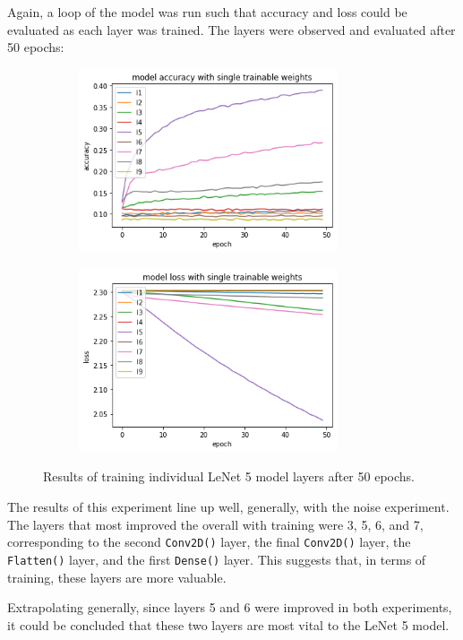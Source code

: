 \documentclass{article}
\begin{document}
Again, a loop of the model was run such that accuracy and loss could be evaluated as each layer was trained.
The layers were observed and evaluated after 50 epochs:

\begin{figure}[H]
\centering
\begin{subfigure}
  \centering
  \includegraphics[width=3in]{csci-8920/hw-2/images/accuracy-trainable.png}
  \label{fig:accuracy-t}
\end{subfigure}%
\begin{subfigure}
  \centering
  \includegraphics[width=3in]{csci-8920/hw-2/images/loss-trainable.png}
  \label{fig:loss-t}
\end{subfigure}
\caption{Results of training individual LeNet 5 model layers after 50 epochs.}
\label{fig:trainable}
\end{figure}

The results of this experiment line up well, generally, with the noise experiment.
The layers that most improved the overall with training were 3, 5, 6, and 7, corresponding to the second \lstinline{Conv2D()} layer, the final \lstinline{Conv2D()} layer, the \lstinline{Flatten()} layer, and the first \lstinline{Dense()} layer.
This suggests that, in terms of training, these layers are more valuable.

Extrapolating generally, since layers 5 and 6 were improved in both experiments, it could be concluded that these two layers are most vital to the LeNet 5 model.
\end{document}
